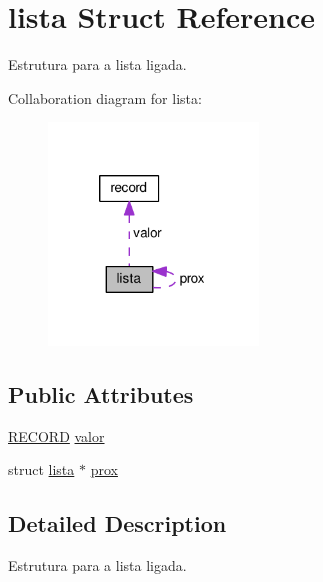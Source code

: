 \hypertarget{structlista}{\section{lista Struct Reference}
\label{structlista}
}


Estrutura para a lista ligada.  




Collaboration diagram for lista\+:
\nopagebreak
\begin{figure}[H]
\begin{center}
\leavevmode
\includegraphics[width=158pt]{structlista__coll__graph}
\end{center}
\end{figure}
\subsection*{Public Attributes}
\begin{DoxyCompactItemize}
\item 
\hyperlink{stack_8c_a44e8f2943831641ea8ac9a833b65f08c}{R\+E\+C\+O\+R\+D} \hyperlink{structlista_a852a031ffa1734cf1750f54248f70bba}{valor}
\item 
struct \hyperlink{structlista}{lista} $\ast$ \hyperlink{structlista_a3b0e375147c1163d74544fd206a1f1de}{prox}
\end{DoxyCompactItemize}


\subsection{Detailed Description}
Estrutura para a lista ligada. 

